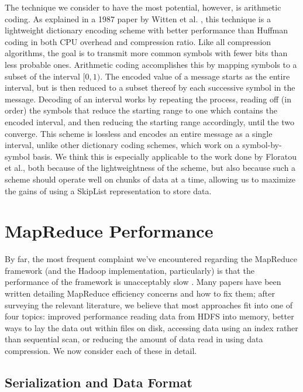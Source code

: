 \documentclass[twocolumn]{article}
\begin{document}
The technique we consider to have the most potential, however, is arithmetic
coding.  As explained in a 1987 paper by Witten et al. \cite{ref:arith}, this
technique is a lightweight dictionary encoding scheme with better performance
than Huffman coding \cite{ref:huffman} in both CPU overhead and compression ratio. 
Like all compression algorithms, the goal is to transmit more common symbols
with fewer bits than less probable ones.  Arithmetic coding accomplishes
this by mapping symbols to a subset of the interval $ [0, 1) $.  The encoded
value of a message starts as the entire interval, but is then
reduced to a subset thereof by each successive symbol in the message.
Decoding of an interval works by repeating the process, reading off (in order)
the symbols that reduce the starting range to one which contains the encoded
interval, and then reducing the starting range accordingly, until the two
converge.  This scheme is lossless and encodes an entire message as a single
interval, unlike other dictionary coding schemes, which work on a
symbol-by-symbol basis.  We think this is especially applicable to the
work done by Floratou et al., both because of the lightweightness of the
scheme, but also because such a scheme should operate well on chunks of data
at a time, allowing us to maximize the gains of using a SkipList representation
to store data.


\section{MapReduce Performance}

By far, the most frequent complaint we've encountered regarding the MapReduce
framework (and the Hadoop implementation, particularly) is that the performance
of the framework is unacceptably slow \cite{ref:friends-or-foes}.  Many papers
have been written detailing
MapReduce efficiency concerns and how to fix them; after surveying the relevant literature,
we believe that most approaches fit into one of four topics: improved performance reading
data from HDFS into memory, better ways to lay the data out within files on disk,
accessing data using an index rather than sequential scan, or reducing the
amount of data read in using data compression.  We now consider each
of these in detail.

\subsection{Serialization and Data Format}
\end{document}
